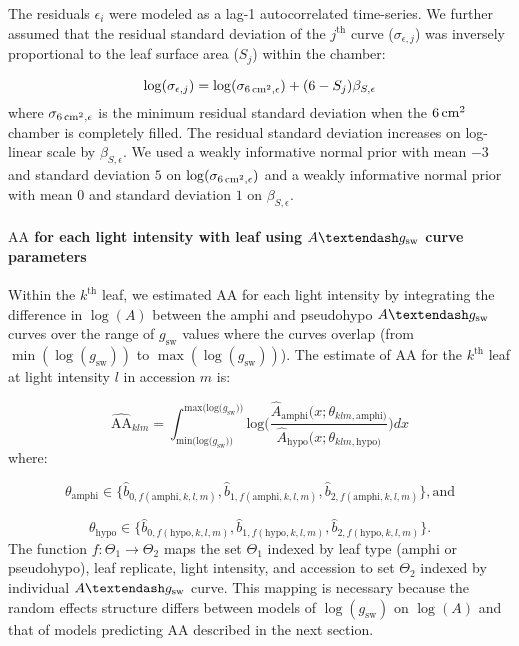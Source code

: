 \documentclass[
  letterpaper,
  DIV=11,
  numbers=noendperiod]{scrartcl}
\let\oldparagraph\paragraph
\renewcommand{\paragraph}[1]{\oldparagraph{#1}\mbox{}}
\newcommand{\aax}{$\mathrm{AA}$}
\newcommand{\agcurve}{$A \textendash g_\text{sw}$}
\newcommand{\gsw}{$g_\text{sw}$}
\newcommand{\loggsw}{$\log(g_\text{sw})$}
\newcommand{\logA}{$\log(A)$}
\begin{document}
The residuals \(\epsilon_{i}\) were modeled as a lag-1 autocorrelated
time-series. We further assumed that the residual standard deviation of
the \(j^{\text{th}}\) curve (\(\sigma_{\epsilon,j}\)) was inversely
proportional to the leaf surface area (\(S_j\)) within the chamber:

\[\log (\sigma_{\epsilon,j}) = \log (\sigma_{\qty{6}{\raiseto{2}\centi\meter},\epsilon}) + (6 - S_j) \beta_{S,\epsilon}\]
where \(\sigma_{\qty{6}{\raiseto{2}\centi\meter},\epsilon}\) is the
minimum residual standard deviation when the
\(\qty{6}{\raiseto{2}\centi\meter}\) chamber is completely filled. The
residual standard deviation increases on log-linear scale by
\(\beta_{S,\epsilon}\). We used a weakly informative normal prior with
mean \(-3\) and standard deviation \(5\) on
\(\log (\sigma_{\qty{6}{\raiseto{2}\centi\meter},\epsilon})\) and a
weakly informative normal prior with mean \(0\) and standard deviation
\(1\) on \(\beta_{S,\epsilon}\).

\paragraph{\texorpdfstring{\aax{} for each light intensity with leaf
using \agcurve{} curve
parameters}{ for each light intensity with leaf using  curve parameters}}\label{for-each-light-intensity-with-leaf-using-curve-parameters}

Within the \(k^{\text{th}}\) leaf, we estimated \aax{} for each light
intensity by integrating the difference in \logA{} between the amphi and
pseudohypo \agcurve{} curves over the range of \gsw{} values where the
curves overlap (from \(\min(\log(g_\text{sw}))\) to
\(\max(\log(g_\text{sw}))\)). The estimate of \aax{} for the
\(k^{\text{th}}\) leaf at light intensity \(l\) in accession \(m\) is:

\[\widehat{\mathrm{AA}}_{klm} = \int_{\text{min(log(}g_\text{sw}))}^{\text{max(log(}g_\text{sw}))} \text{log}\bigg(\frac{\hat{A}_\text{amphi}(x; \theta_{klm,\text{amphi})}}{\hat{A}_\text{hypo}(x; \theta_{klm,\text{hypo})}}\bigg) dx\]
where:

\[\theta_\text{amphi} \in \{\hat{b}_{0, f(\text{amphi}, k,l,m)}, \hat{b}_{1, f(\text{amphi}, k,l,m)}, \hat{b}_{2, f(\text{amphi}, k,l,m)}\}, \text{and}\]

\[\theta_\text{hypo} \in \{\hat{b}_{0, f(\text{hypo}, k,l,m)}, \hat{b}_{1, f(\text{hypo}, k,l,m)}, \hat{b}_{2, f(\text{hypo}, k,l,m)}\}.\]
The function \(f : \Theta_1 \rightarrow \Theta_2\) maps the set
\(\Theta_1\) indexed by leaf type (amphi or pseudohypo), leaf replicate,
light intensity, and accession to set \(\Theta_2\) indexed by individual
\agcurve{} curve. This mapping is necessary because the random effects
structure differs between models of \loggsw{} on \logA{} and that of
models predicting \aax{} described in the next section.
\end{document}
